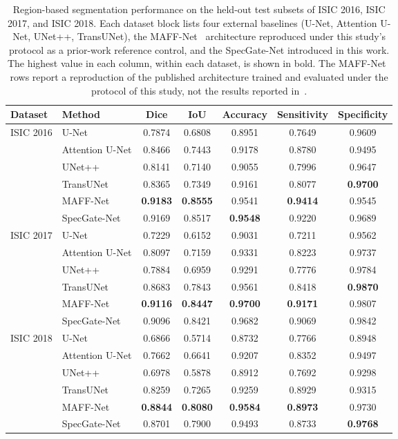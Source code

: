 \begin{table}[!t]
\centering
\caption{Region-based segmentation performance on the held-out test subsets of
ISIC 2016, ISIC 2017, and ISIC 2018. Each dataset block lists four external baselines (U-Net, Attention U-Net, UNet++, TransUNet), the MAFF-Net~\cite{ref15} architecture reproduced under this study's protocol as a prior-work reference control, and the SpecGate-Net introduced in this work. The highest value in each column, within each dataset, is shown in bold. The MAFF-Net~\cite{ref15} rows report a reproduction of the published architecture trained and evaluated under the protocol of this study, not the results reported in~\cite{ref15}.}
\label{tab:benchmark}
\setlength{\tabcolsep}{5pt}
\footnotesize
\begin{tabular}{llccccc}
\toprule
Dataset & Method & Dice & IoU & Accuracy & Sensitivity & Specificity \\
\midrule
\multirow{6}{*}{ISIC 2016}
 & U-Net & 0.7874 & 0.6808 & 0.8951 & 0.7649 & 0.9609 \\
 & Attention U-Net & 0.8466 & 0.7443 & 0.9178 & 0.8780 & 0.9495 \\
 & UNet++ & 0.8141 & 0.7140 & 0.9055 & 0.7996 & 0.9647 \\
 & TransUNet & 0.8365 & 0.7349 & 0.9161 & 0.8077 & \textbf{0.9700} \\
 & MAFF-Net~\cite{ref15} & \textbf{0.9183} & \textbf{0.8555} & 0.9541 & \textbf{0.9414} & 0.9545 \\
 & SpecGate-Net & 0.9169 & 0.8517 & \textbf{0.9548} & 0.9220 & 0.9689 \\
\midrule
\multirow{6}{*}{ISIC 2017}
 & U-Net & 0.7229 & 0.6152 & 0.9031 & 0.7211 & 0.9562 \\
 & Attention U-Net & 0.8097 & 0.7159 & 0.9331 & 0.8223 & 0.9737 \\
 & UNet++ & 0.7884 & 0.6959 & 0.9291 & 0.7776 & 0.9784 \\
 & TransUNet & 0.8683 & 0.7843 & 0.9561 & 0.8418 & \textbf{0.9870} \\
 & MAFF-Net~\cite{ref15} & \textbf{0.9116} & \textbf{0.8447} & \textbf{0.9700} & \textbf{0.9171} & 0.9807 \\
 & SpecGate-Net & 0.9096 & 0.8421 & 0.9682 & 0.9069 & 0.9842 \\
\midrule
\multirow{6}{*}{ISIC 2018}
 & U-Net & 0.6866 & 0.5714 & 0.8732 & 0.7766 & 0.8948 \\
 & Attention U-Net & 0.7662 & 0.6641 & 0.9207 & 0.8352 & 0.9497 \\
 & UNet++ & 0.6978 & 0.5878 & 0.8912 & 0.7692 & 0.9298 \\
 & TransUNet & 0.8259 & 0.7265 & 0.9259 & 0.8929 & 0.9315 \\
 & MAFF-Net~\cite{ref15} & \textbf{0.8844} & \textbf{0.8080} & \textbf{0.9584} & \textbf{0.8973} & 0.9730 \\
 & SpecGate-Net & 0.8701 & 0.7900 & 0.9493 & 0.8733 & \textbf{0.9768} \\
\bottomrule
\end{tabular}
\end{table}

